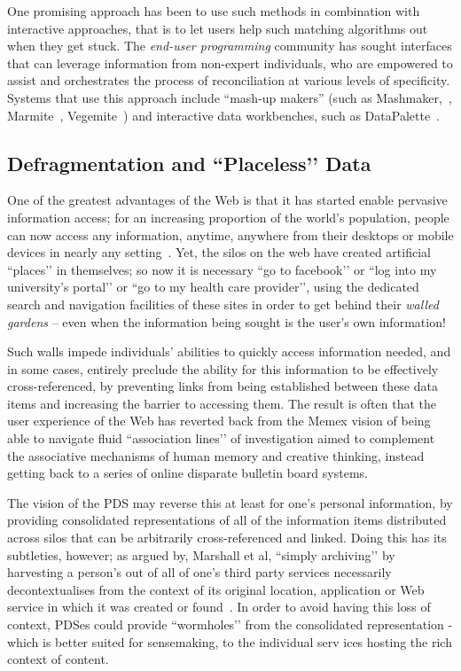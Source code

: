 \documentclass[graybox]{svmult}
\begin{document}
One promising approach has been to use such methods in combination with interactive approaches, that is to let users help such matching algorithms out when they get stuck.  The \emph{end-user programming} community has sought interfaces that can leverage information from non-expert individuals, who are empowered to assist and orchestrates the process of reconciliation at various levels of specificity.  Systems that use this approach include ``mash-up makers'' (such as Mashmaker,~\cite{intel_mashmaker}, Marmite~\cite{Lin:2009:EPM:1502650.1502667}, Vegemite~\cite{Wong:2007:MMM:1240624.1240842}) and interactive data workbenches, such as DataPalette~\cite{van2013carpe}.

\subsection{Defragmentation and ``Placeless’’ Data}
One of the greatest advantages of the Web is that it has started enable pervasive information access; for an increasing proportion of the world’s population, people can now access any information, anytime, anywhere from their desktops or mobile devices in nearly any setting~\cite{perry2001dealing}. Yet, the silos on the web have created artificial ``places’’  in themselves; so now it is necessary ``go to facebook’’ or ``log into my university’s portal’’ or ``go to my health care provider’’, using the dedicated search and navigation facilities of these sites in order to get behind their \emph{walled gardens} -- even when the information being sought is the user’s own information!

Such walls impede individuals’ abilities to quickly access information needed, and in some cases, entirely preclude the ability for this information to be effectively cross-referenced, by preventing links from being established between these data items and increasing the barrier to accessing them.  The result is often that the user experience of the Web has reverted back from the Memex vision of being able to navigate fluid ``association lines’’ of investigation aimed to complement the associative mechanisms of human memory and creative thinking, instead getting back to a series of online disparate bulletin board systems.

The vision of the PDS may reverse this at least for one’s personal information, by providing consolidated representations of all of the information items distributed across silos that can be arbitrarily cross-referenced and linked.  Doing this has its subtleties, however;  as argued by, Marshall et al, ``simply archiving’’ by  harvesting a person’s out of all of one’s third party services necessarily decontextualises from the context of its original location, application or Web service in which it was created or found~\cite{marshall2011challenges}.  In order to avoid having this loss of context, PDSes could provide ``wormholes’’ from the consolidated representation - which is better suited for sensemaking, to the individual serv ices hosting the rich context of content.
\end{document}

